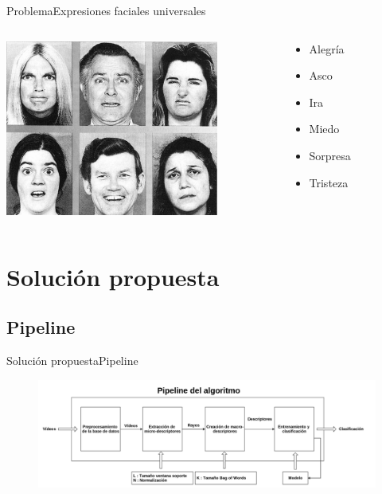 \documentclass{beamer}
\begin{document}
    \begin{frame}{Problema}{Expresiones faciales universales}
		  \begin{columns}[onlytextwidth]
    		  	\begin{column}{0.7\textwidth}
      			\centering
      			\includegraphics[width=7cm]{imagenes/expresiones_faciales_universales.jpg}
    			\end{column}
    		    \begin{column}{0.3\textwidth}
        	      \begin{itemize}
            	    \item Alegría
            		\item Asco
            		\item Ira
            		\item Miedo
            		\item Sorpresa
            		\item Tristeza
        	   	  \end{itemize}
            \end{column}
          \end{columns}          
    \end{frame}
    
\section{Solución propuesta}
	\subsection{Pipeline}    
    \begin{frame}{Solución propuesta}{Pipeline}
        \begin{figure}[bt]
    		\centering
            \includegraphics[width=12cm]{imagenes/pipeline.png}
        \end{figure}
    \end{frame}
	
\end{document}
